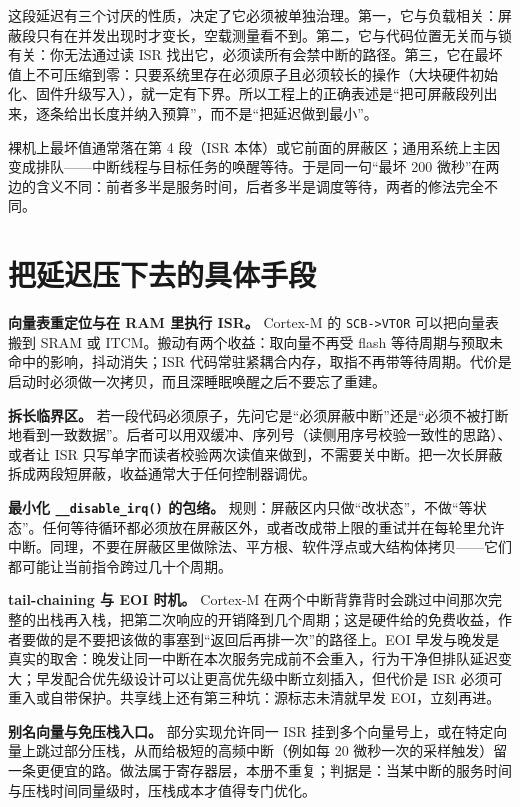 \documentclass[12pt,a4paper,fontset=fandol]{ctexbook}
\newcommand{\Fn}[1]{\texttt{#1()}}
\newcommand{\Tp}[1]{\texttt{#1}}
\begin{document}
这段延迟有三个讨厌的性质，决定了它必须被单独治理。第一，它与负载相关：屏蔽段只有在并发出现时才变长，空载测量看不到。第二，它与代码位置无关而与锁有关：你无法通过读 ISR 找出它，必须读所有会禁中断的路径。第三，它在最坏值上不可压缩到零：只要系统里存在必须原子且必须较长的操作（大块硬件初始化、固件升级写入），就一定有下界。所以工程上的正确表述是``把可屏蔽段列出来，逐条给出长度并纳入预算''，而不是``把延迟做到最小''。

\begin{compare}[title={同样五段，主因不同}]
裸机上最坏值通常落在第 4 段（ISR 本体）或它前面的屏蔽区；通用系统上主因变成排队——中断线程与目标任务的唤醒等待。于是同一句``最坏 200 微秒''在两边的含义不同：前者多半是服务时间，后者多半是调度等待，两者的修法完全不同。
\end{compare}

\section{把延迟压下去的具体手段}

\textbf{向量表重定位与在 RAM 里执行 ISR。} Cortex-M 的 \Tp{SCB->VTOR} 可以把向量表搬到 SRAM 或 ITCM。搬动有两个收益：取向量不再受 flash 等待周期与预取未命中的影响，抖动消失；ISR 代码常驻紧耦合内存，取指不再带等待周期。代价是启动时必须做一次拷贝，而且深睡眠唤醒之后不要忘了重建。

\textbf{拆长临界区。} 若一段代码必须原子，先问它是``必须屏蔽中断''还是``必须不被打断地看到一致数据''。后者可以用双缓冲、序列号（读侧用序号校验一致性的思路）、或者让 ISR 只写单字而读者校验两次读值来做到，不需要关中断。把一次长屏蔽拆成两段短屏蔽，收益通常大于任何控制器调优。

\textbf{最小化 \Fn{\_\_disable\_irq} 的包络。} 规则：屏蔽区内只做``改状态''，不做``等状态''。任何等待循环都必须放在屏蔽区外，或者改成带上限的重试并在每轮里允许中断。同理，不要在屏蔽区里做除法、平方根、软件浮点或大结构体拷贝——它们都可能让当前指令跨过几十个周期。

\textbf{tail-chaining 与 EOI 时机。} Cortex-M 在两个中断背靠背时会跳过中间那次完整的出栈再入栈，把第二次响应的开销降到几个周期；这是硬件给的免费收益，作者要做的是不要把该做的事塞到``返回后再排一次''的路径上。EOI 早发与晚发是真实的取舍：晚发让同一中断在本次服务完成前不会重入，行为干净但排队延迟变大；早发配合优先级设计可以让更高优先级中断立刻插入，但代价是 ISR 必须可重入或自带保护。共享线上还有第三种坑：源标志未清就早发 EOI，立刻再进。

\textbf{别名向量与免压栈入口。} 部分实现允许同一 ISR 挂到多个向量号上，或在特定向量上跳过部分压栈，从而给极短的高频中断（例如每 20 微秒一次的采样触发）留一条更便宜的路。做法属于寄存器层，本册不重复；判据是：当某中断的服务时间与压栈时间同量级时，压栈成本才值得专门优化。
\end{document}
